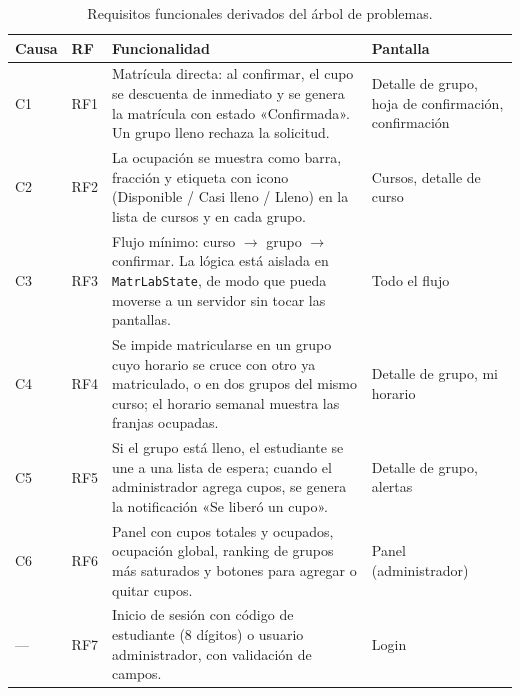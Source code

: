 \begin{table}[H]
	\centering\footnotesize
	\begin{tabularx}{\textwidth}{|p{0.9cm}|p{1.1cm}|X|p{3.2cm}|}
		\hline
		\rowcolor{tablebackground}\color{white}\textbf{Causa} & \color{white}\textbf{RF} & \color{white}\textbf{Funcionalidad} & \color{white}\textbf{Pantalla}\\
		\hline
		C1 & RF1 & Matrícula directa: al confirmar, el cupo se descuenta de inmediato y se genera la matrícula con estado «Confirmada». Un grupo lleno rechaza la solicitud. & Detalle de grupo, hoja de confirmación, confirmación \\\hline
		C2 & RF2 & La ocupación se muestra como barra, fracción y etiqueta con icono (Disponible / Casi lleno / Lleno) en la lista de cursos y en cada grupo. & Cursos, detalle de curso \\\hline
		C3 & RF3 & Flujo mínimo: curso $\rightarrow$ grupo $\rightarrow$ confirmar. La lógica está aislada en \texttt{MatrLabState}, de modo que pueda moverse a un servidor sin tocar las pantallas. & Todo el flujo \\\hline
		C4 & RF4 & Se impide matricularse en un grupo cuyo horario se cruce con otro ya matriculado, o en dos grupos del mismo curso; el horario semanal muestra las franjas ocupadas. & Detalle de grupo, mi horario \\\hline
		C5 & RF5 & Si el grupo está lleno, el estudiante se une a una lista de espera; cuando el administrador agrega cupos, se genera la notificación «Se liberó un cupo». & Detalle de grupo, alertas \\\hline
		C6 & RF6 & Panel con cupos totales y ocupados, ocupación global, ranking de grupos más saturados y botones para agregar o quitar cupos. & Panel (administrador) \\\hline
		— & RF7 & Inicio de sesión con código de estudiante (8 dígitos) o usuario administrador, con validación de campos. & Login \\\hline
	\end{tabularx}
	\caption{Requisitos funcionales derivados del árbol de problemas.}
	\label{tab:rf}
\end{table}

